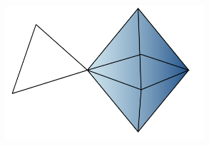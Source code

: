 \documentclass[landscape,a0paper,blockverticalspace = 5mm]{tikzposter}
\begin{document}
\begin{columns}
{{\begin{center}
\begin{minipage}{0.16\linewidth}
\begin{center}
        
          \end{center}
      \end{minipage} 
   \begin{minipage}{0.1\linewidth}
      \begin{center}
      
		        
         \end{center}
      \end{minipage} \hspace{0cm}
	\begin{minipage}{0.16\linewidth}
	\begin{center}
          \includegraphics[height=5cm]{figures/high-order.png}
          
        
          \end{center}
      \end{minipage}    
    \end{center}
    
    
    
}}
\end{columns}
\end{document}
